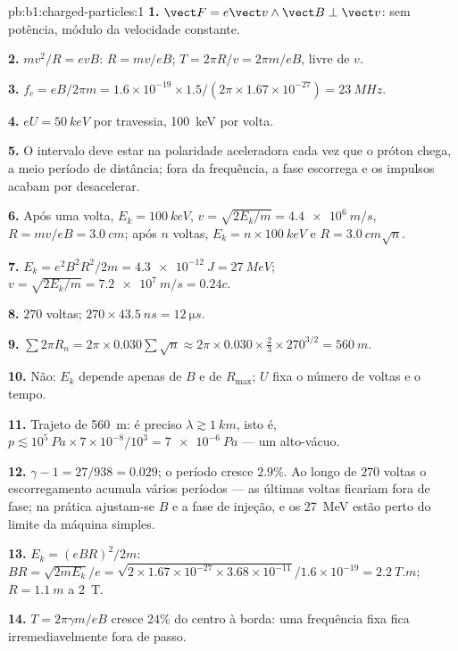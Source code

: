 \begin{solution}{pb:b1:charged-particles:1}
\textbf{1.} $\vect F = e\vect v\wedge\vect B \perp \vect v$: sem potência, módulo da
velocidade constante.

\textbf{2.} $mv^2/R = evB$: $R = mv/eB$; $T = 2\pi R/v = 2\pi m/eB$, livre de
$v$.

\textbf{3.} $f_c = eB/2\pi m = 1.6\times10^{-19} \times 1.5/(2\pi \times 1.67
\times10^{-27}) = \qty{23}{MHz}$.

\textbf{4.} $eU = \qty{50}{keV}$ por travessia, \qty{100}{keV} por volta.

\textbf{5.} O intervalo deve estar na polaridade aceleradora cada vez que o
próton chega, a meio período de distância; fora da frequência, a fase escorrega e
os impulsos acabam por desacelerar.

\textbf{6.} Após uma volta, $E_k = \qty{100}{keV}$, $v = \sqrt{2E_k/m} =
\qty{4.4e6}{m/s}$, $R = mv/eB = \qty{3.0}{cm}$; após $n$ voltas, $E_k =
n \times \qty{100}{keV}$ e $R = \qty{3.0}{cm}\sqrt n$.

\textbf{7.} $E_k = e^2B^2R^2/2m = \qty{4.3e-12}{J} = \qty{27}{MeV}$; $v =
\sqrt{2E_k/m} = \qty{7.2e7}{m/s} = 0.24c$.

\textbf{8.} $270$ voltas; $270 \times \qty{43.5}{ns} = \qty{12}{\micro s}$.

\textbf{9.} $\sum 2\pi R_n = 2\pi \times 0.030\sum\sqrt n \approx 2\pi \times 0.030
\times \tfrac23 \times 270^{3/2} = \qty{560}{m}$.

\textbf{10.} Não: $E_k$ depende apenas de $B$ e de $R_{\max}$; $U$ fixa o
número de voltas e o tempo.

\textbf{11.} Trajeto de \qty{560}{m}: é preciso $\lambda \gtrsim \qty{1}{km}$, isto é,\
$p \lesssim 10^5\ \unit{Pa} \times 7\times10^{-8}/10^3 = \qty{7e-6}{Pa}$ ---
um alto-vácuo.

\textbf{12.} $\gamma - 1 = 27/938 = 0.029$; o período cresce $2.9\%$.
Ao longo de $270$ voltas o escorregamento acumula vários períodos --- as últimas
voltas ficariam fora de fase; na prática ajustam-se $B$ e a fase de injeção,
e os \qty{27}{MeV} estão perto do limite da máquina simples.

\textbf{13.} $E_k = (eBR)^2/2m$: $BR = \sqrt{2mE_k}/e = \sqrt{2 \times 1.67\times
10^{-27} \times 3.68\times10^{-11}}/1.6\times10^{-19} = \qty{2.2}{T.m}$; $R =
\qty{1.1}{m}$ a \qty{2}{T}.

\textbf{14.} $T = 2\pi\gamma m/eB$ cresce $24\%$ do centro à borda: uma
frequência fixa fica irremediavelmente fora de passo.


\end{solution}
